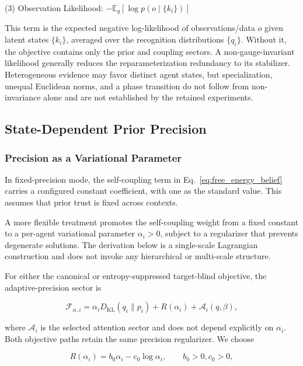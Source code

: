 \documentclass[twoside,11pt]{article}
\begin{document}
(3) Observation Likelihood: $-\mathbb{E}_q[\log p(o \mid \{k_i\})]$

This term is the expected negative log-likelihood of observations/data $o$ given latent states $\{k_i\}$, averaged over the recognition distributions $\{q_i\}$. Without it, the objective contains only the prior and coupling sectors. A non-gauge-invariant likelihood generally reduces the reparameterization redundancy to its stabilizer. Heterogeneous evidence may favor distinct agent states, but specialization, unequal Euclidean norms, and a phase transition do not follow from non-invariance alone and are not established by the retained experiments.

\subsection{State-Dependent Prior Precision}
\label{sec:state_dependent_precision}

\subsubsection{Precision as a Variational Parameter}

In fixed-precision mode, the self-coupling term in Eq.~\eqref{eq:free_energy_belief} carries a configured constant coefficient, with one as the standard value. This assumes that prior trust is fixed across contexts.

A more flexible treatment promotes the self-coupling weight from a fixed constant to a per-agent variational parameter $\alpha_i > 0$, subject to a regularizer that prevents degenerate solutions. The derivation below is a single-scale Lagrangian construction and does not invoke any hierarchical or multi-scale structure.

For either the canonical or entropy-suppressed target-blind objective, the adaptive-precision sector is

\begin{equation}
\mathcal{F}_{\alpha,i}
=\alpha_iD_{\mathrm{KL}}(q_i\|p_i)+R(\alpha_i)+\mathcal{A}_i(q,\beta),
\label{eq:free_energy_adaptive}
\end{equation}

where $\mathcal{A}_i$ is the selected attention sector and does not depend explicitly on $\alpha_i$. Both objective paths retain the same precision regularizer. We choose

\begin{equation}
R(\alpha_i) = b_0 \alpha_i - c_0 \log \alpha_i, \qquad b_0 > 0, c_0 > 0,
\label{eq:precision_regularizer}
\end{equation}
\end{document}
